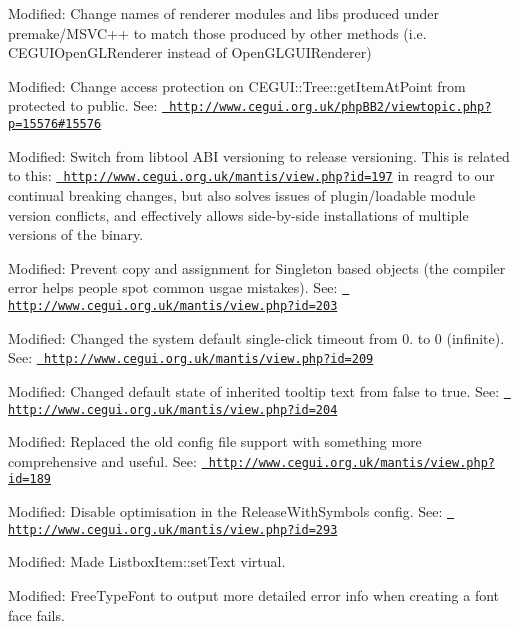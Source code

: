 \begin{DoxyItemize}
\item Modified\+: Change names of renderer modules and libs produced under premake/\+M\+S\+V\+C++ to match those produced by other methods (i.\+e. C\+E\+G\+U\+I\+Open\+G\+L\+Renderer instead of Open\+G\+L\+G\+U\+I\+Renderer)
\item Modified\+: Change access protection on C\+E\+G\+U\+I\+::\+Tree\+::get\+Item\+At\+Point from protected to public. See\+: \href{http://www.cegui.org.uk/phpBB2/viewtopic.php?p=15576\#15576}{\texttt{ http\+://www.\+cegui.\+org.\+uk/php\+B\+B2/viewtopic.\+php?p=15576\#15576}}
\item Modified\+: Switch from libtool A\+BI versioning to release versioning. This is related to this\+: \href{http://www.cegui.org.uk/mantis/view.php?id=197}{\texttt{ http\+://www.\+cegui.\+org.\+uk/mantis/view.\+php?id=197}} in reagrd to our continual breaking changes, but also solves issues of plugin/loadable module version conflicts, and effectively allows side-\/by-\/side installations of multiple versions of the binary.
\item Modified\+: Prevent copy and assignment for Singleton based objects (the compiler error helps people spot common usgae mistakes). See\+: \href{http://www.cegui.org.uk/mantis/view.php?id=203}{\texttt{ http\+://www.\+cegui.\+org.\+uk/mantis/view.\+php?id=203}}
\item Modified\+: Changed the system default \textquotesingle{}single-\/click\textquotesingle{} timeout from 0. to 0 (infinite). See\+: \href{http://www.cegui.org.uk/mantis/view.php?id=209}{\texttt{ http\+://www.\+cegui.\+org.\+uk/mantis/view.\+php?id=209}}
\item Modified\+: Changed default state of inherited tooltip text from false to true. See\+: \href{http://www.cegui.org.uk/mantis/view.php?id=204}{\texttt{ http\+://www.\+cegui.\+org.\+uk/mantis/view.\+php?id=204}}
\item Modified\+: Replaced the old config file support with something more comprehensive and useful. See\+: \href{http://www.cegui.org.uk/mantis/view.php?id=189}{\texttt{ http\+://www.\+cegui.\+org.\+uk/mantis/view.\+php?id=189}}
\item Modified\+: Disable optimisation in the Release\+With\+Symbols config. See\+: \href{http://www.cegui.org.uk/mantis/view.php?id=293}{\texttt{ http\+://www.\+cegui.\+org.\+uk/mantis/view.\+php?id=293}}
\item Modified\+: Made Listbox\+Item\+::set\+Text virtual.
\item Modified\+: Free\+Type\+Font to output more detailed error info when creating a font face fails.

\end{DoxyItemize}

